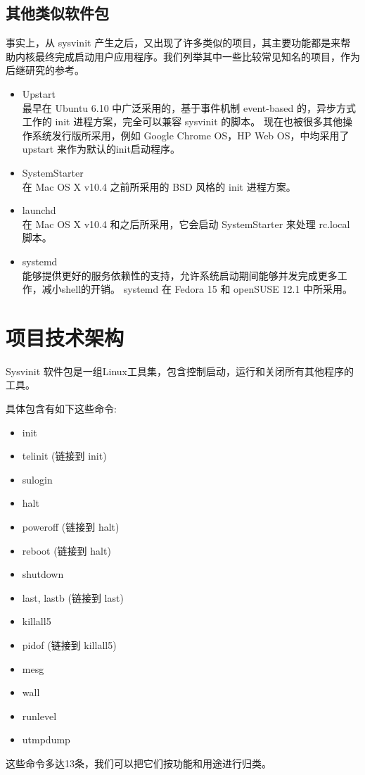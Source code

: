 \subsection{其他类似软件包}

事实上，从 sysvinit
产生之后，又出现了许多类似的项目，其主要功能都是来帮助内核最终完成启动用户应用程序。我们列举其中一些比较常见知名的项目，作为后继研究的参考。

\begin{itemize}
\item
  Upstart\\最早在 Ubuntu 6.10 中广泛采用的，基于事件机制 event-based
  的，异步方式工作的 init 进程方案，完全可以兼容 sysvinit 的脚本。
  现在也被很多其他操作系统发行版所采用，例如 Google Chrome OS，HP Web
  OS，中均采用了 upstart 来作为默认的init启动程序。
\item
  SystemStarter\\在 Mac OS X v10.4 之前所采用的 BSD 风格的 init
  进程方案。
\item
  launchd\\在 Mac OS X v10.4 和之后所采用，它会启动 SystemStarter 来处理
  rc.local 脚本。
\item
  systemd\\能够提供更好的服务依赖性的支持，允许系统启动期间能够并发完成更多工作，减小shell的开销。
  systemd 在 Fedora 15 和 openSUSE 12.1 中所采用。
\end{itemize}
\section{项目技术架构}

Sysvinit
软件包是一组Linux工具集，包含控制启动，运行和关闭所有其他程序的工具。

具体包含有如下这些命令:

\begin{itemize}
\item
  init
\item
  telinit (链接到 init)
\item
  sulogin
\item
  halt
\item
  poweroff (链接到 halt)
\item
  reboot (链接到 halt)
\item
  shutdown
\item
  last, lastb (链接到 last)
\item
  killall5
\item
  pidof (链接到 killall5)
\item
  mesg
\item
  wall
\item
  runlevel
\item
  utmpdump
\end{itemize}
这些命令多达13条，我们可以把它们按功能和用途进行归类。

